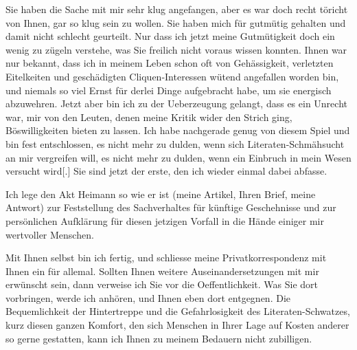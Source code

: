 \pstart
           Sie haben die Sache mit mir sehr klug angefangen, aber es war doch recht töricht von
               Ihnen, gar so klug sein zu wollen. Sie haben mich für gutmütig gehalten und damit
               nicht schlecht ge{\pb}urteilt. Nur
               dass ich jetzt meine Gutmütigkeit doch ein wenig zu zügeln verstehe, was Sie freilich
               nicht voraus wissen konnten. Ihnen war nur bekannt, dass ich in meinem Leben schon
               oft von Gehässigkeit, verletzten Eitelkeiten und geschädigten Cliquen-Interessen
               wütend angefallen worden bin, und niemals so viel Ernst für derlei Dinge aufgebracht
               habe, um sie energisch abzuwehren. Jetzt aber bin ich zu der Ueberzeugung gelangt,
               dass es ein Unrecht war, mir von den Leuten, denen meine Kritik wider den Strich
               ging, Böswilligkeiten bieten zu lassen. Ich habe nachgerade genug von diesem Spiel
               und bin fest entschlossen, es nicht mehr zu dulden, wenn sich Literaten-Schmähsucht
               an mir vergreifen will, es nicht mehr zu dulden, wenn ein Einbruch in mein Wesen
               versucht wird{[}.{]} Sie sind jetzt der erste, den ich wieder einmal
               dabei abfasse.\pend
           
\pstart
           Ich lege den Akt Heimann so wie er ist (meine
                  Artikel, Ihren
               Brief, meine Antwort) zur Feststellung des Sachverhaltes für künftige Geschehnisse
               und zur persönlichen Aufklärung für diesen jetzigen Vorfall in die Hände einiger mir
               wertvoller Menschen.\pend
           
\pstart
           Mit Ihnen selbst bin ich fertig, und schliesse meine Privatkorrespondenz mit Ihnen
               ein für allemal. Sollten Ihnen weitere Auseinandersetzungen mit mir erwünscht sein,
               dann verweise ich Sie vor die Oeffentlichkeit. Was Sie dort vorbringen, werde ich
               anhören, und Ihnen eben dort entgegnen. Die Bequemlichkeit der Hintertreppe und die
               Gefahrlosigkeit des Literaten-Schwatzes, kurz diesen ganzen Komfort, den sich
               Menschen in Ihrer Lage auf Kosten anderer so gerne gestatten, kann ich Ihnen zu
               meinem Bedauern nicht zubilligen.\pend
           \endnumbering{}  \newcommand{\dateiname}{L03438}\newcommand{\titel}{Felix Salten an Arthur Schnitzler, 20. 4. 1907}\newcommand{\editorInnen}{Martin Anton Müller und Laura Untner}
